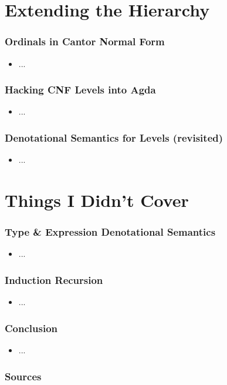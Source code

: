 \documentclass[dvipsnames,aspectratio=169,pdftex]{beamer}
\begin{document}
\section{Extending the Hierarchy}

\begin{frame}[fragile]
  \frametitle{Ordinals in Cantor Normal Form}
  \begin{itemize}
    \item ...
  \end{itemize}
\end{frame}

\begin{frame}[fragile]
  \frametitle{Hacking CNF Levels into Agda}
  \begin{itemize}
    \item ...
  \end{itemize}
\end{frame}

\begin{frame}[fragile]
  \frametitle{Denotational Semantics for Levels (revisited)}
  \begin{itemize}
    \item ...
  \end{itemize}
\end{frame}


\section{Things I Didn't Cover}

\begin{frame}[fragile]
  \frametitle{Type \& Expression Denotational Semantics}
  \begin{itemize}
    \item ...
  \end{itemize}
\end{frame}

\begin{frame}[fragile]
  \frametitle{Induction Recursion}
  \begin{itemize}
    \item ...
  \end{itemize}
\end{frame}

\begin{frame}[fragile]
  \frametitle{Conclusion}
  \begin{itemize}
    \item ...
  \end{itemize}
\end{frame}

\begin{frame}[fragile]
  \frametitle{Sources}  
   
  
\end{frame}
\end{document}
